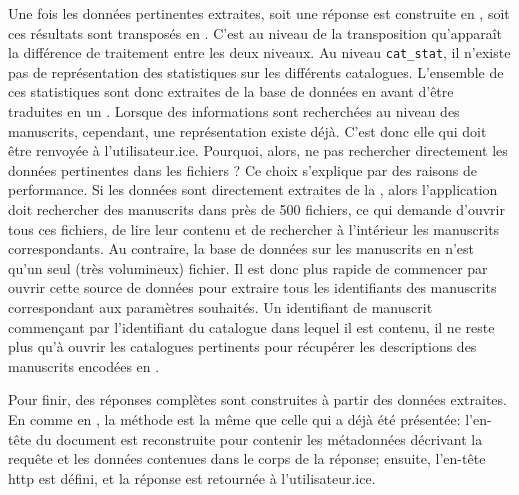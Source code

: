 Une fois les données pertinentes extraites, soit une réponse est construite en \json{}, soit ces résultats sont transposés en \tei{}. C'est au niveau de la transposition qu'apparaît la différence de traitement entre les deux niveaux. Au niveau \texttt{cat\_stat}, il n'existe pas de représentation \tei{} des statistiques sur les différents catalogues. L'ensemble de ces statistiques sont donc extraites de la base de données en \json{} avant d'être traduites en un \tei{}. Lorsque des informations sont recherchées au niveau des manuscrits, cependant, une représentation \tei{} existe déjà. C'est donc elle qui doit être renvoyée à l'utilisateur.ice. Pourquoi, alors, ne pas rechercher directement les données pertinentes dans les fichiers \tei{}? Ce choix s'explique par des raisons de performance. Si les données sont directement extraites de la \tei{}, alors l'application doit rechercher des manuscrits dans près de 500 fichiers, ce qui demande d'ouvrir tous ces fichiers, de lire leur contenu et de rechercher à l'intérieur les manuscrits correspondants. Au contraire, la base de données sur les manuscrits en \json{} n'est qu'un seul (très volumineux) fichier. Il est donc plus rapide de commencer par ouvrir cette source de données pour extraire tous les identifiants des manuscrits correspondant aux paramètres souhaités. Un identifiant de manuscrit commençant par l'identifiant du catalogue dans lequel il est contenu, il ne reste plus qu'à ouvrir les catalogues pertinents pour récupérer les descriptions des manuscrits encodées en \tei{}.

Pour finir, des réponses complètes sont construites à partir des données extraites. En \json{} comme en \tei{}, la méthode est la même que celle qui a déjà été présentée: l'en-tête du document est reconstruite pour contenir les métadonnées décrivant la requête et les données contenues dans le corps de la réponse; ensuite, l'en-tête \gls{http} est défini, et la réponse est retournée à l'utilisateur.ice.

